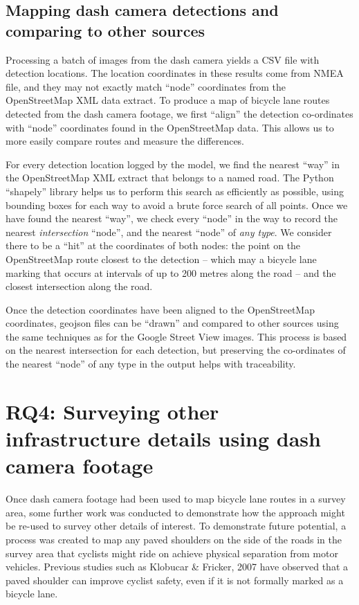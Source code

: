 \documentclass[11pt,twoside]{report}
\begin{document}
\subsection{Mapping dash camera detections and comparing to other sources}
\label{s:rq3d}

Processing a batch of images from the dash camera yields a CSV file with detection locations.  The location coordinates in these results come from NMEA file, and they may not exactly match ``node'' coordinates from the OpenStreetMap XML data extract.  To produce a map of bicycle lane routes detected from the dash camera footage, we first ``align'' the detection co-ordinates with ``node'' coordinates found in the OpenStreetMap data.  This allows us to more easily compare routes and measure the differences.

For every detection location logged by the model, we find the nearest ``way'' in the OpenStreetMap XML extract that belongs to a named road.  The Python ``shapely'' library helps us to perform this search as efficiently as possible, using bounding boxes for each way to avoid a brute force search of all points.  Once we have found the nearest ``way'', we check every ``node'' in the way to record the nearest \textit{intersection} ``node'', and the nearest ``node'' of \textit{any type}.  We consider there to be a ``hit'' at the coordinates of both nodes:  the point on the OpenStreetMap route closest to the detection -- which may a bicycle lane marking that occurs at intervals of up to 200 metres along the road \cite{standards} -- and the closest intersection along the road.

Once the detection coordinates have been aligned to the OpenStreetMap coordinates, geojson files can be ``drawn'' and compared to other sources using the same techniques as for the Google Street View images.  This process is based on the nearest intersection for each detection, but preserving the co-ordinates of the nearest ``node'' of any type in the output helps with traceability.


\section{RQ4: Surveying other infrastructure details using dash camera footage}

Once dash camera footage had been used to map bicycle lane routes in a survey area, some further work was conducted to demonstrate how the approach might be re-used to survey other details of interest.  To demonstrate future potential, a process was created to map any paved shoulders on the side of the roads in the survey area that cyclists might ride on achieve physical separation from motor vehicles.  Previous studies such as Klobucar \& Fricker, 2007 \cite{BIKESAFETY} have observed that a paved shoulder can improve cyclist safety, even if it is not formally marked as a bicycle lane.
\end{document}
